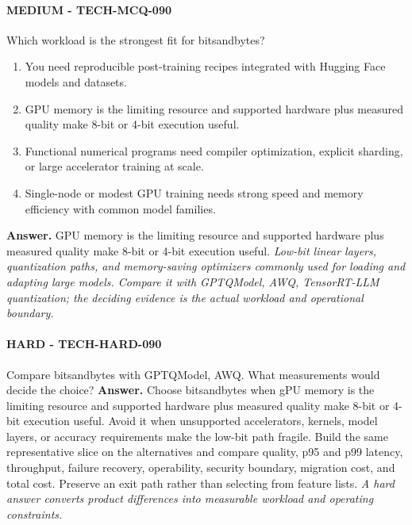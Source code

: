 \paragraph{MEDIUM - TECH-MCQ-090} Which workload is the strongest fit for bitsandbytes?
\begin{enumerate}[label=\Alph*.]
\item You need reproducible post-training recipes integrated with Hugging Face models and datasets.
\item GPU memory is the limiting resource and supported hardware plus measured quality make 8-bit or 4-bit execution useful.
\item Functional numerical programs need compiler optimization, explicit sharding, or large accelerator training at scale.
\item Single-node or modest GPU training needs strong speed and memory efficiency with common model families.
\end{enumerate}
\textbf{Answer.} GPU memory is the limiting resource and supported hardware plus measured quality make 8-bit or 4-bit execution useful.
\textit{Low-bit linear layers, quantization paths, and memory-saving optimizers commonly used for loading and adapting large models. Compare it with GPTQModel, AWQ, TensorRT-LLM quantization; the deciding evidence is the actual workload and operational boundary.}
\paragraph{HARD - TECH-HARD-090} Compare bitsandbytes with GPTQModel, AWQ. What measurements would decide the choice?
\textbf{Answer.} Choose bitsandbytes when gPU memory is the limiting resource and supported hardware plus measured quality make 8-bit or 4-bit execution useful. Avoid it when unsupported accelerators, kernels, model layers, or accuracy requirements make the low-bit path fragile. Build the same representative slice on the alternatives and compare quality, p95 and p99 latency, throughput, failure recovery, operability, security boundary, migration cost, and total cost. Preserve an exit path rather than selecting from feature lists.
\textit{A hard answer converts product differences into measurable workload and operating constraints.}
